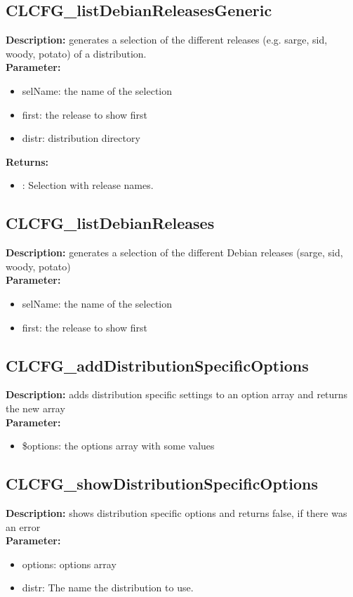 \subsection{CLCFG\_listDebianReleasesGeneric}
\textbf{Description:} generates a selection of the different releases (e.g. sarge, sid, woody, potato) of a distribution.\\
\textbf{Parameter:}
\begin{itemize}
\item selName: the name of the selection
\item first: the release to show first
\item distr: distribution directory
\end{itemize}
\textbf{Returns:}
\begin{itemize}
\item : Selection with release names.
\end{itemize}

\subsection{CLCFG\_listDebianReleases}
\textbf{Description:} generates a selection of the different Debian releases (sarge, sid, woody, potato)\\
\textbf{Parameter:}
\begin{itemize}
\item selName: the name of the selection
\item first: the release to show first
\end{itemize}

\subsection{CLCFG\_addDistributionSpecificOptions}
\textbf{Description:} adds distribution specific settings to an option array and returns the new array\\
\textbf{Parameter:}
\begin{itemize}
\item \$options: the options array with some values
\end{itemize}

\subsection{CLCFG\_showDistributionSpecificOptions}
\textbf{Description:} shows distribution specific options and returns false, if there was an error\\
\textbf{Parameter:}
\begin{itemize}
\item options: options array
\item distr: The name the distribution to use.
\end{itemize}

